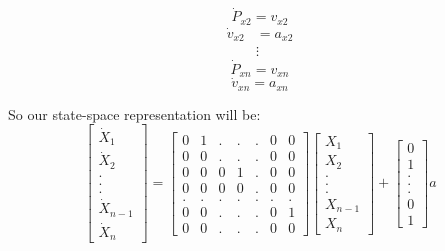 \documentclass[10pt,letterpaper]{article}
\begin{document}
\begin{equation}
\dot{P}_{x2}= v_{x2}
\end{equation}
\begin{align}
\dot{v}_{x2} &= a_{x2}\\
&\vdots
\end{align}
\begin{equation}
\dot{P}_{xn}= v_{xn}
\end{equation}
\begin{equation}
\dot{v}_{xn} = a_{xn}
\end{equation}

\begin{flushleft}
So our state-space representation will be:
\begin{equation}
\begin{bmatrix}
\dot{X}_1\\ 
\dot{X}_2\\
.\\
.\\
.\\
\dot{X}_{n-1}\\
\dot{X}_n

\end{bmatrix} = \begin{bmatrix}
0 & 1 & . & . & . & 0 & 0 \\
0 & 0 & . & . & . & 0 & 0 \\
0 & 0 & 0 & 1 & . & 0 & 0 \\
0 & 0 & 0 & 0 & . & 0 & 0 \\
. & . & . & . & . & . & . \\
0 & 0 & . & . & . & 0 & 1 \\
0 & 0 & . & . & . & 0 & 0 
\end{bmatrix}  \begin{bmatrix}
X_1\\
X_2\\
.\\
.\\
.\\
X_{n-1}\\
X_n
\end{bmatrix} + \begin{bmatrix}
0\\
1\\
.\\
.\\
.\\
0\\
1
\end{bmatrix} a
\end{equation}


\end{flushleft}
\end{document}
